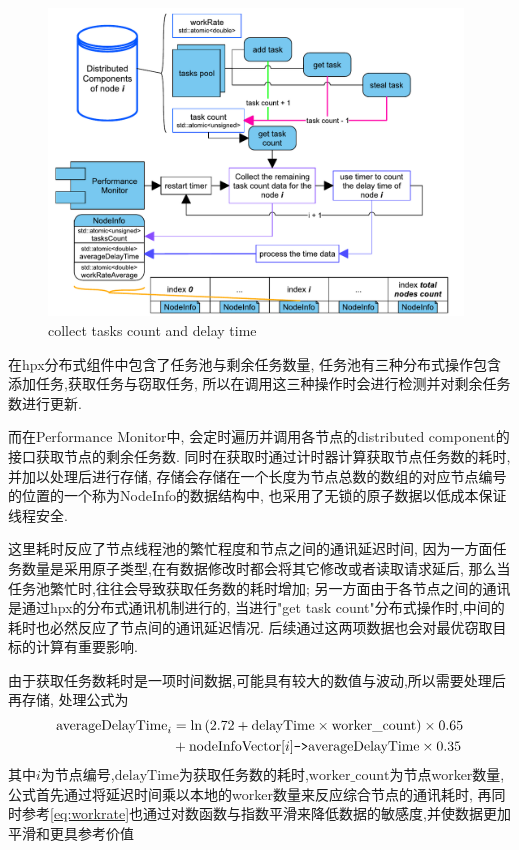 \documentclass{mproj}
\begin{document}
\begin{figure}[h]
    \centering %
    \includegraphics[width=0.98\textwidth]{images/tasks_detection.pdf} %
    \caption{collect tasks count and delay time} %
    \label{fig:tasks_detection} %
\end{figure}
\FloatBarrier

在hpx分布式组件中包含了任务池与剩余任务数量,
任务池有三种分布式操作包含添加任务,获取任务与窃取任务,
所以在调用这三种操作时会进行检测并对剩余任务数进行更新.

而在Performance Monitor中,
会定时遍历并调用各节点的distributed component的接口获取节点的剩余任务数.
同时在获取时通过计时器计算获取节点任务数的耗时,并加以处理后进行存储,
存储会存储在一个长度为节点总数的数组的对应节点编号的位置的一个称为NodeInfo的数据结构中,
也采用了无锁的原子数据以低成本保证线程安全.

这里耗时反应了节点线程池的繁忙程度和节点之间的通讯延迟时间,
因为一方面任务数量是采用原子类型,在有数据修改时都会将其它修改或者读取请求延后,
那么当任务池繁忙时,往往会导致获取任务数的耗时增加;
另一方面由于各节点之间的通讯是通过hpx的分布式通讯机制进行的,
当进行"get task count"分布式操作时,中间的耗时也必然反应了节点间的通讯延迟情况.
后续通过这两项数据也会对最优窃取目标的计算有重要影响.

由于获取任务数耗时是一项时间数据,可能具有较大的数值与波动,所以需要处理后再存储,
处理公式为
\begin{align}
    \text{averageDelayTime}_i & = \ln\left(2.72 + \text{delayTime} \times \text{worker\_count}\right) \times 0.65 \notag               \\
                              & + \text{nodeInfoVector}[i]\texttt{->}\text{averageDelayTime} \times 0.35   \label{eq:averageDelayTime}
\end{align}
其中$i$为节点编号,$\text{delayTime}$为获取任务数的耗时,$\text{worker\_count}$为节点worker数量,
公式首先通过将延迟时间乘以本地的worker数量来反应综合节点的通讯耗时,
再同时参考\cref{eq:workrate}也通过对数函数与指数平滑来降低数据的敏感度,并使数据更加平滑和更具参考价值
\end{document}
